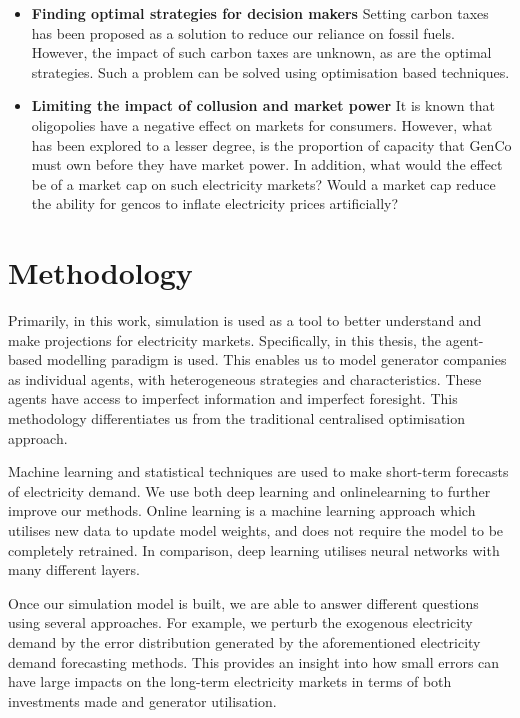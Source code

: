 \begin{itemize}
	\item \textbf{Finding optimal strategies for decision makers} Setting carbon taxes has been proposed as a solution to reduce our reliance on fossil fuels. However, the impact of such carbon taxes are unknown, as are the optimal strategies. Such a problem can be solved using optimisation based techniques.
	
	\item \textbf{Limiting the impact of collusion and market power} It is known that oligopolies have a negative effect on markets for consumers. However, what has been explored to a lesser degree, is the proportion of capacity that \gls{GenCo} must own before they have market power. In addition, what would the effect be of a market cap on such electricity markets? Would a market cap reduce the ability for \acrfull{gencos} to inflate electricity prices artificially?
	
\end{itemize}

\section{Methodology}

Primarily, in this work, simulation is used as a tool to better understand and make projections for electricity markets. Specifically, in this thesis, the agent-based modelling paradigm is used. This enables us to model generator companies as individual agents, with heterogeneous strategies and characteristics. These agents have access to imperfect information and imperfect foresight. This methodology differentiates us from the traditional centralised optimisation approach.

Machine learning and statistical techniques are used to make short-term forecasts of electricity demand. We use both deep learning and \gls{onlinelearning} to further improve our methods. Online learning is a machine learning approach which utilises new data to update model weights, and does not require the model to be completely retrained. In comparison, deep learning utilises neural networks with many different layers.

Once our simulation model is built, we are able to answer different questions using several approaches. For example, we perturb the exogenous electricity demand by the error distribution generated by the aforementioned electricity demand forecasting methods. This provides an insight into how small errors can have large impacts on the long-term electricity markets in terms of both investments made and generator utilisation.

